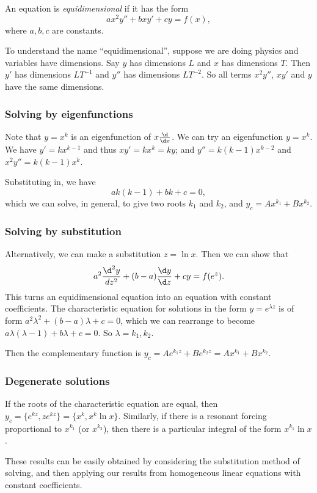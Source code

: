 \documentclass[a4paper]{article}
\begin{document}
\begin{defi}
  An equation is \emph{equidimensional} if it has the form
  \[
    ax^2y'' + bxy' + cy = f(x),
  \]
  where $a, b, c$ are constants.
\end{defi}
To understand the name ``equidimensional'', suppose we are doing physics and variables have dimensions. Say $y$ has dimensions $L$ and $x$ has dimensions $T$. Then $y'$ has dimensions $LT^{-1}$ and $y''$ has dimensions $LT^{-2}$. So all terms $x^2 y''$, $xy'$ and $y$ have the same dimensions.

\subsubsection*{Solving by eigenfunctions}
Note that $y = x^k$ is an eigenfunction of $x\frac{\d}{\d x}$. We can try an eigenfunction $y = x^k$. We have $y' = kx^{k - 1}$ and thus $xy' = kx^k = ky$; and $y'' = k(k - 1)x^{k - 2}$ and $x^2y'' = k(k - 1)x^k$.

Substituting in, we have
\[
  ak(k - 1) + bk + c = 0,
\]
which we can solve, in general, to give two roots $k_1$ and $k_2$, and $y_c = Ax^{k_1} + Bx^{k_2}$.

\subsubsection*{Solving by substitution}
Alternatively, we can make a substitution $z = \ln x$. Then we can show that
\[
  a^2\frac{\d ^2 y}{d z^2} + (b - a)\frac{\d y}{\d z} + cy = f(e^z).
\]
This turns an equidimensional equation into an equation with constant coefficients. The characteristic equation for solutions in the form $y = e^{\lambda z}$ is of form $a^2\lambda^2 + (b - a)\lambda + c = 0$, which we can rearrange to become $a\lambda(\lambda - 1) + b\lambda + c = 0$. So $\lambda = k_1, k_2$.

Then the complementary function is $y_c = Ae^{k_1z} + Be^{k_2z} = Ax^{k_1} + Bx^{k_2}$.

\subsubsection*{Degenerate solutions}
If the roots of the characteristic equation are equal, then $y_c = \{e^{kz}, ze^{kz}\} = \{x^k, x^k\ln x\}$. Similarly, if there is a resonant forcing proportional to $x^{k_1}$ (or $x^{k_2}$), then there is a particular integral of the form $x^{k_1}\ln x$.

These results can be easily obtained by considering the substitution method of solving, and then applying our results from homogeneous linear equations with constant coefficients.
\end{document}
